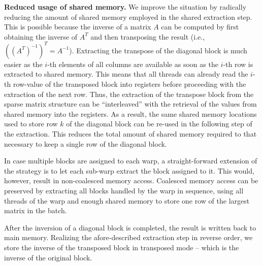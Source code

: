 \vspace*{1ex}
\noindent
\textbf{Reduced usage of shared memory.}
We improve the situation by radically reducing the amount of shared memory employed in the
shared extraction step.
This is possible because the inverse of a matrix $A$ can be computed
by first obtaining the inverse of $A^T$ and then transposing the result
(i.e., $((A^T)^{-1})^T = A^{-1}$).
Extracting the transpose of the diagonal block is much easier
as the $i$-th elements of all columns are 
available as soon as the $i$-th row is extracted to shared memory.
This means that all threads can already read the $i$-th row-value
of the transposed block into registers before proceeding with the extraction
of the next row.
Thus, the extraction of the transpose block
from the sparse matrix structure can be ``interleaved'' with
{the retrieval of} the values from shared memory into the registers.
As a result, the same shared memory locations
used to store row $k$ of the diagonal block
can be re-used in the following step of the extraction.
This reduces the total {amount of} shared memory required to 
{that necessary to keep} a single row of the diagonal block.

In case multiple blocks are assigned to each warp,
a straight-forward extension of the strategy is to
{let each sub-warp extract} the block assigned to it.
This would, however, result in non-coalesced memory access.
Coalesced memory access can be preserved
by extracting all blocks handled by the warp in sequence,
using all threads of the warp and {enough shared memory to store one}
row of the largest matrix in the batch.

After the inversion of a diagonal block is completed,
the result is written back to main memory.
Realizing the afore-described extraction step in reverse order,
we store the inverse of the transposed block in transposed mode
 -- which is the inverse of the original block.

